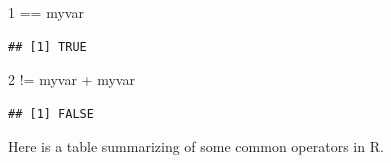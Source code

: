 \documentclass[
]{book}
\newenvironment{Shaded}{\begin{snugshade}}{\end{snugshade}}
\newcommand{\DecValTok}[1]{\textcolor[rgb]{0.00,0.00,0.81}{#1}}
\newcommand{\NormalTok}[1]{#1}
\newcommand{\SpecialCharTok}[1]{\textcolor[rgb]{0.00,0.00,0.00}{#1}}
\begin{document}
\begin{Shaded}
\begin{Highlighting}[]
\DecValTok{1} \SpecialCharTok{==}\NormalTok{ myvar}
\end{Highlighting}
\end{Shaded}

\begin{verbatim}
## [1] TRUE
\end{verbatim}

\begin{Shaded}
\begin{Highlighting}[]
\DecValTok{2} \SpecialCharTok{!=}\NormalTok{ myvar }\SpecialCharTok{+}\NormalTok{ myvar}
\end{Highlighting}
\end{Shaded}

\begin{verbatim}
## [1] FALSE
\end{verbatim}

Here is a table summarizing of some common operators in R.
\end{document}
